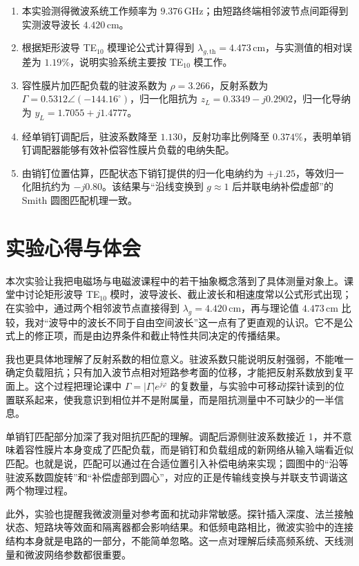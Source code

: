 \documentclass[UTF8]{ctexart}
\begin{document}
\begin{enumerate}
  \item 本实验测得微波系统工作频率为 $9.376\,\mathrm{GHz}$；由短路终端相邻波节点间距得到实测波导波长 $4.420\,\mathrm{cm}$。
  \item 根据矩形波导 TE$_{10}$ 模理论公式计算得到 $\lambda_{g,\mathrm{th}}=4.473\,\mathrm{cm}$，与实测值的相对误差为 $1.19\%$，说明实验系统主要按 TE$_{10}$ 模工作。
  \item 容性膜片加匹配负载的驻波系数为 $\rho=3.266$，反射系数为 $\Gamma=0.5312\angle(-144.16^\circ)$，归一化阻抗为 $z_L=0.3349-j0.2902$，归一化导纳为 $y_L=1.7055+j1.4777$。
  \item 经单销钉调配后，驻波系数降至 $1.130$，反射功率比例降至 $0.374\%$，表明单销钉调配器能够有效补偿容性膜片负载的电纳失配。
  \item 由销钉位置估算，匹配状态下销钉提供的归一化电纳约为 $+j1.25$，等效归一化阻抗约为 $-j0.80$。该结果与“沿线变换到 $g\approx1$ 后并联电纳补偿虚部”的 Smith 圆图匹配机理一致。
\end{enumerate}

\section{实验心得与体会}

本次实验让我把电磁场与电磁波课程中的若干抽象概念落到了具体测量对象上。课堂中讨论矩形波导 TE$_{10}$ 模时，波导波长、截止波长和相速度常以公式形式出现；在实验中，通过两个相邻波节点直接得到 $\lambda_g=4.420\,\mathrm{cm}$，再与理论值 $4.473\,\mathrm{cm}$ 比较，我对“波导中的波长不同于自由空间波长”这一点有了更直观的认识。它不是公式上的修正项，而是由边界条件和截止特性共同决定的传播结果。

我也更具体地理解了反射系数的相位意义。驻波系数只能说明反射强弱，不能唯一确定负载阻抗；只有加入波节点相对短路参考面的位移，才能把反射系数放到复平面上。这个过程把理论课中 $\Gamma=|\Gamma|e^{j\varphi}$ 的复数量，与实验中可移动探针读到的位置联系起来，使我意识到相位并不是附属量，而是阻抗测量中不可缺少的一半信息。

单销钉匹配部分加深了我对阻抗匹配的理解。调配后源侧驻波系数接近 1，并不意味着容性膜片本身变成了匹配负载，而是销钉和负载组成的新网络从输入端看近似匹配。也就是说，匹配可以通过在合适位置引入补偿电纳来实现；圆图中的“沿等驻波系数圆旋转”和“补偿虚部到圆心”，对应的正是传输线变换与并联支节调谐这两个物理过程。

此外，实验也提醒我微波测量对参考面和扰动非常敏感。探针插入深度、法兰接触状态、短路块等效面和隔离器都会影响结果。和低频电路相比，微波实验中的连接结构本身就是电路的一部分，不能简单忽略。这一点对理解后续高频系统、天线测量和微波网络参数都很重要。
\end{document}
